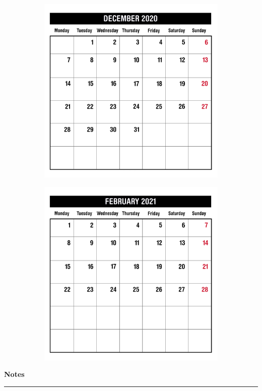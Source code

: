\begin{figure}[H]
\begin{subfigure}[l]{0.5\textwidth}
    \includegraphics[width=\textwidth]{Sources/MonthViews/December20.jpg}
  \end{subfigure}
  \begin{subfigure}[l]{0.5\textwidth}
    \includegraphics[width=\textwidth]{Sources/MonthViews/February21.jpg}
  \end{subfigure}
\end{figure}


\newpage
\begin{notesbox}
\textbf{Notes} \\
\rule{\linewidth}{0.02cm}
\end{notesbox}